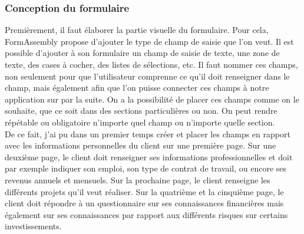 \documentclass[12pt,oneside,noprintercorrection]{iut}
\begin{document}
 \subsubsection{Conception du formulaire}
 Premièrement, il faut élaborer la partie visuelle du formulaire. Pour cela, FormAssembly propose d'ajouter le type de champ de saisie que l'on veut. Il est possible d'ajouter à son formulaire un champ de saisie de texte, une zone de texte, des cases à cocher, des listes de sélections, etc. Il faut nommer ces champs, non seulement pour que l'utilisateur comprenne ce qu'il doit renseigner dans le champ, mais également afin que l'on puisse connecter ces champs à notre application sur \slf par la suite. On a la possibilité de placer ces champs comme on le souhaite, que ce soit dans des sections particulières ou non. On peut rendre répétable ou obligatoire n'importe quel champ ou n'importe quelle section. 
 ~\\\indent De ce fait, j'ai pu dans un premier temps créer et placer les champs en rapport avec les informations personnelles du client sur une première page. Sur une deuxième page, le client doit renseigner ses informations professionnelles et doit par exemple indiquer son emploi, son type de contrat de travail, ou encore ses revenus annuels et mensuels. Sur la prochaine page, le client renseigne les différents projets qu'il veut réaliser. Sur la quatrième et la cinquième page, le client doit répondre à un questionnaire sur ses connaissances financières mais également sur ses connaissances par rapport aux différents risques sur certains investissements.
 
\end{document}
